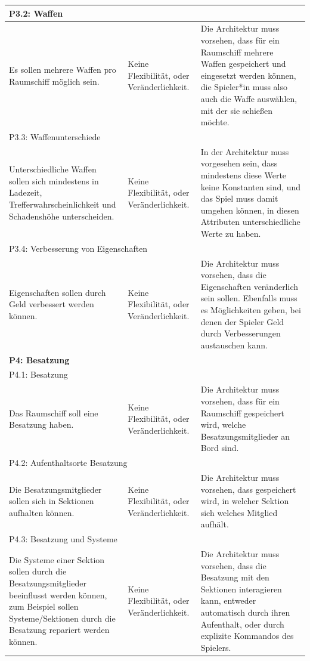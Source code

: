\documentclass[fontsize=12pt,paper=a4,twoside]{scrartcl}
\begin{document}
\begin{longtable}[c]{|p{5cm}|p{5cm}|p{5cm}|}
\multicolumn{3}{|l|}{{P3.2: Waffen}} 
\\ \hline
Es sollen mehrere Waffen pro Raumschiff möglich sein. & Keine Flexibilität, oder Veränderlichkeit.    & Die Architektur muss vorsehen, dass für ein Raumschiff mehrere Waffen gespeichert und eingesetzt werden können, die Spieler*in muss also auch die Waffe auswählen, mit der sie schießen möchte. 
\\ \hline
\multicolumn{3}{|l|}{{P3.3: Waffenunterschiede}} 
\\ \hline
Unterschiedliche Waffen sollen sich mindestens in Ladezeit, Trefferwahrscheinlichkeit und Schadenshöhe unterscheiden. & Keine Flexibilität, oder Veränderlichkeit.    &  In der Architektur muss vorgesehen sein, dass mindestens diese Werte keine Konstanten sind, und das Spiel muss damit umgehen können, in diesen Attributen unterschiedliche Werte zu haben. 
\\ \hline
\multicolumn{3}{|l|}{{P3.4: Verbesserung von Eigenschaften}} 
\\ \hline
Eigenschaften sollen durch Geld verbessert werden können. & Keine Flexibilität, oder Veränderlichkeit.    & Die Architektur muss vorsehen, dass die Eigenschaften veränderlich sein sollen. Ebenfalls muss es Möglichkeiten geben, bei denen der Spieler Geld durch Verbesserungen austauschen kann.  
\\ \hline
%
\multicolumn{3}{|l|}{{\textbf{P4: Besatzung}}} 
\\ \hline
\multicolumn{3}{|l|}{{P4.1: Besatzung}} 
\\ \hline
Das Raumschiff soll eine Besatzung haben. & Keine Flexibilität, oder Veränderlichkeit.    &  Die Architektur muss vorsehen, dass für ein Raumschiff gespeichert wird, welche Besatzungsmitglieder an Bord sind. 
\\ \hline  
\multicolumn{3}{|l|}{{P4.2: Aufenthaltsorte Besatzung}} 
\\ \hline
Die Besatzungsmitglieder sollen sich in Sektionen aufhalten können. & Keine Flexibilität, oder Veränderlichkeit.    &  Die Architektur muss vorsehen, dass gespeichert wird, in welcher Sektion sich welches Mitglied aufhält. 
\\ \hline                                                  
\multicolumn{3}{|l|}{{P4.3: Besatzung und Systeme}} 
\\ \hline
Die Systeme einer Sektion sollen durch die Besatzungsmitglieder beeinflusst werden können, zum Beispiel sollen Systeme/Sektionen durch die Besatzung repariert werden können. & Keine Flexibilität, oder Veränderlichkeit.    &  Die Architektur muss vorsehen, dass die Besatzung mit den Sektionen interagieren kann, entweder automatisch durch ihren Aufenthalt, oder durch explizite Kommandos des Spielers. 

\end{longtable}
\end{document}
